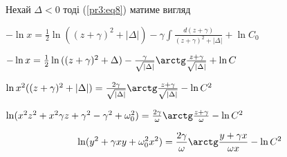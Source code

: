 

Нехай $\Delta < 0$ тоді  (\ref{pr3:eq8}) матиме вигляд 

$-\ln x = \frac{1}{2} \ln {((z+\gamma)^2 + |\Delta|)} - \gamma \int \frac{d(z+\gamma)}{(z + \gamma)^2 + |\Delta|} + \ln C_0$

$-\ln x = \frac{1}{2} \ln {((z+\gamma)^2 + \Delta)} - \frac{\gamma}{\sqrt{|\Delta|}} \arctg \frac{z+\gamma}{\sqrt{|\Delta|}}+ \ln C$

$\ln x^2((z+\gamma)^2 +|\Delta|) = \frac{2\gamma}{\sqrt{|\Delta|}} \arctg \frac{z+\gamma}{\sqrt{|\Delta|}} - \ln C^2$

$\ln ( x^2z^2+x^2\gamma z + \gamma^2 - \gamma^2 + \omega_0^2) = \frac{2\gamma}{\omega} \arctg \frac{z+\gamma}{\omega} - \ln C^2$

\begin{equation}
    \ln ( y^2+\gamma xy + \omega_0^2 x^2) = \frac{2\gamma}{\omega} \arctg \frac{y+\gamma x}{\omega x} - \ln C^2
\end{equation}



